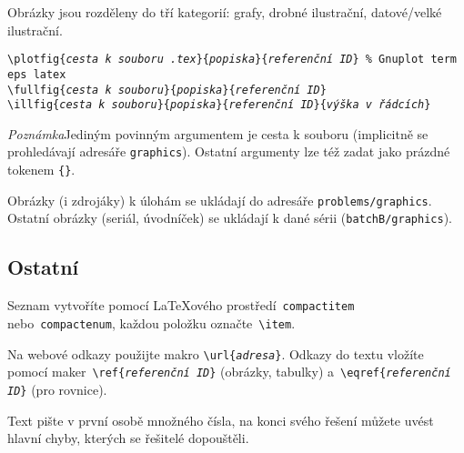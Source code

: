 \documentclass[fykos]{fksbase} %
\begin{document}
Obrázky jsou rozděleny do tří kategorií: grafy, drobné ilustrační, datové/velké
ilustrační.
\smallskip

\noindent\verb|\plotfig{|{\tt \itshape cesta k souboru .tex}\verb|}{|{\tt \itshape popiska}\verb|}{|{\tt \itshape referenční ID}\verb|} % Gnuplot term eps latex|\\
\verb|\fullfig{|{\tt \itshape cesta k souboru}\verb|}{|{\tt \itshape popiska}\verb|}{|{\tt \itshape referenční ID}\verb|}|\\
\verb|\illfig{|{\tt \itshape cesta k souboru}\verb|}{|{\tt \itshape popiska}\verb|}{|{\tt \itshape referenční ID}\verb|}{|{\tt \itshape výška v řádcích}\verb|}|
\smallskip

\emph{Poznámka}\quad Jediným povinným argumentem je cesta k souboru
(implicitně se prohledávají adresáře \verb|graphics|).
Ostatní argumenty lze též zadat jako prázdné tokenem \verb|{}|.

Obrázky (i zdrojáky) k úlohám se ukládají do adresáře \verb|problems/graphics|.
Ostatní obrázky (seriál, úvodníček) se ukládají k dané sérii
(\verb|batchB/graphics|).

\subsection{Ostatní}

Seznam vytvoříte pomocí {\LaTeX}ového prostředí~\verb|compactitem| nebo~\verb|compactenum|,
každou položku označte~\verb|\item|.

Na webové odkazy použijte makro \verb|\url{|{\tt \itshape adresa}\verb|}|. Odkazy do textu vložíte pomocí
maker~\verb|\ref{|{\tt \itshape referenční ID}\verb|}| (obrázky, tabulky) a~\verb|\eqref{|{\tt \itshape referenční ID}\verb|}| (pro rovnice).

Text pište v první osobě množného čísla, na konci svého řešení můžete uvést
hlavní chyby, kterých se řešitelé dopouštěli.
\end{document}

